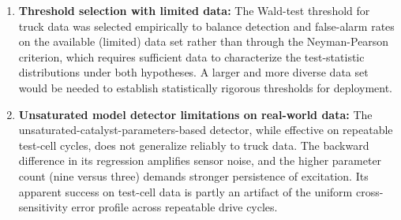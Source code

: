 \begin{enumerate}
    \item \textbf{Threshold selection with limited data:}
    The Wald-test threshold for truck data was selected empirically to balance detection and false-alarm rates on the
    available (limited) data set rather than through the Neyman-Pearson criterion, which requires sufficient data to
    characterize the test-statistic distributions under both hypotheses. A larger and more diverse data set would be
    needed to establish statistically rigorous thresholds for deployment.

    \item \textbf{Unsaturated model detector limitations on real-world data:}
    The unsaturated-catalyst-parameters-based detector, while effective on repeatable test-cell cycles, does not
    generalize reliably to truck data. The backward difference in its regression amplifies sensor noise, and the higher
    parameter count (nine versus three) demands stronger persistence of excitation. Its apparent success on test-cell
    data is partly an artifact of the uniform cross-sensitivity error profile across repeatable drive cycles.
\end{enumerate}